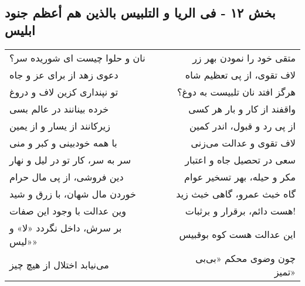 \begin{center}
\section*{بخش ۱۲ - فی الریا و التلبیس بالذین هم أعظم جنود ابلیس}
\label{sec:012}
\begin{longtable}{l p{0.5cm} r}
نان و حلوا چیست ای شوریده سر؟
&&
متقی خود را نمودن بهر زر
\\
دعوی زهد از برای عز و جاه
&&
لاف تقوی، از پی تعظیم شاه
\\
تو نپنداری کزین لاف و دروغ
&&
هرگز افتد نان تلبیست به دوغ؟
\\
خرده بینانند در عالم بسی
&&
واقفند از کار و بار هر کسی
\\
زیرکانند از یسار و از یمین
&&
از پی رد و قبول، اندر کمین
\\
با همه خودبینی و کبر و منی
&&
لاف تقوی و عدالت می‌زنی
\\
سر به سر، کار تو در لیل و نهار
&&
سعی در تحصیل جاه و اعتبار
\\
دین فروشی، از پی مال حرام
&&
مکر و حیله، بهر تسخیر عوام
\\
خوردن مال شهان، با زرق و شید
&&
گاه خبث عمرو، گاهی خبث زید
\\
وین عدالت با وجود این صفات
&&
هست دائم، برقرار و برثبات!
\\
بر سرش، داخل نگردد «لا» و «لیس»
&&
این عدالت هست کوه بوقبیس
\\
می‌نیابد اختلال از هیچ چیز
&&
چون وضوی محکم «بی‌بی تمیز»
\\
\end{longtable}
\end{center}
